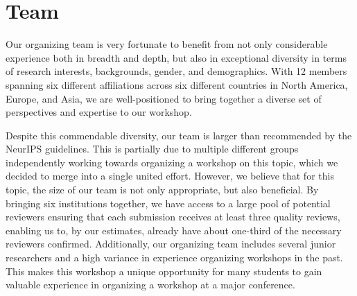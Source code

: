 \documentclass{article}
\begin{document}



\section{Team}

Our organizing team is very fortunate to benefit from not only considerable experience both in breadth and depth, but also in exceptional diversity in terms of research interests, backgrounds, gender, and demographics. With 12 members spanning six different affiliations across six different countries in North America, Europe, and Asia, we are well-positioned to bring together a diverse set of perspectives and expertise to our workshop.

Despite this commendable diversity, our team is larger than recommended by the NeurIPS guidelines. This is partially due to multiple different groups independently working towards organizing a workshop on this topic, which we decided to merge into a single united effort.
However, we believe that for this topic, the size of our team is not only appropriate, but also beneficial. 
By bringing six institutions together, we have access to a large pool of potential reviewers ensuring that each submission receives at least three quality reviews, enabling us to, by our estimates, already have about one-third of the necessary reviewers confirmed.
Additionally, our organizing team includes several junior researchers and a high variance in experience organizing workshops in the past. This makes this workshop a unique opportunity for many students to gain valuable experience in organizing a workshop at a major conference.

\end{document}
